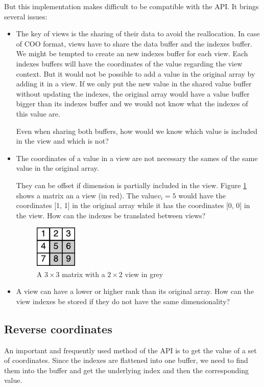But this implementation makes difficult to be compatible with the API. It brings several issues:
\begin{itemize}
	\item The key of views is the sharing of their data to avoid the reallocation. In case of COO format, views have to share the data buffer and the indexes buffer. 
	We might be tempted to create an new indexes buffer for each view. Each indexes buffers will have the coordinates of the value regarding the view context. But it  would not be possible to add a value in the original array by adding it in a view. If we only put the new value in the shared value buffer without updating the indexes, the original array would have a value buffer bigger than its indexes buffer and we would not know what the indexes of this value are. 
	
	Even when sharing both buffers, how would we know which value is included in the view and which is not? 	
	
	\item The coordinates of a value in a view are not necessary the sames of the same value in the original array. 
		
	They can be offset if dimension is partially included in the view. Figure \ref{fig:viewOffset} shows a matrix an a view (in red). The value$ v_{i}=5$ would have the coordinates [1, 1] in the original array while it has the coordinates [0, 0] in the view. How can the indexes be translated between views?
	\begin{figure}[!h]
		\centering
		\includegraphics[width=0.8in]{images/viewIndexOffset.pdf}
		\caption{A $3\times 3$ matrix with a $2\times 2$ view in grey}
		\label{fig:viewOffset}
	\end{figure}

	\item A view can have a lower or higher rank than its original array. How can the view indexes be stored if they do not have the same dimensionality?
\end{itemize}

\subsection{Reverse coordinates}
\label{ssec:reverse}
An important and frequently used method of the API is to get the value of a set of coordinates. Since the indexes are flattened into one buffer, we need to find them into  the buffer and get the underlying index and then the corresponding value.

